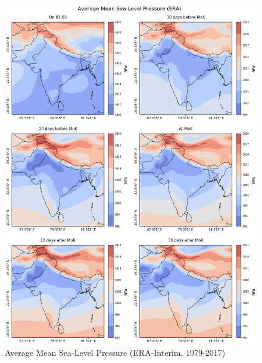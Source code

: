 \begin{figure}[h]
  \centering
  \includegraphics[width=\linewidth]{./99_appendix/img/msl_avg}
  \caption{Average Mean Sea-Level Pressure (ERA-Interim, 1979-2017)}
  \label{apx:era_msl}
\end{figure}

